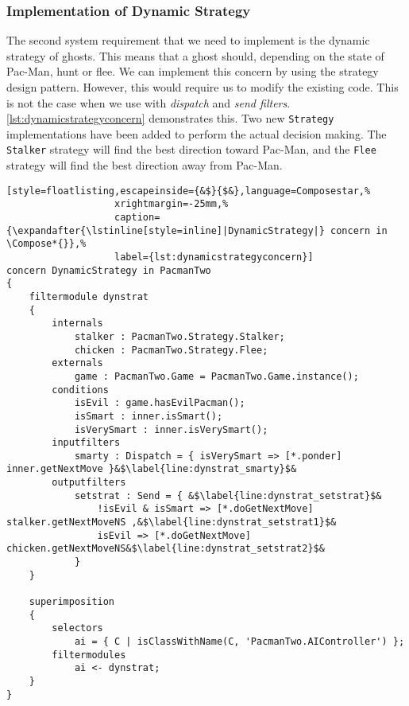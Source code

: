 \subsubsection{Implementation of Dynamic Strategy}

The second system requirement that we need to implement is the dynamic strategy of ghosts.
This means that a ghost should, depending on the state of Pac-Man, hunt or flee.
We can implement this concern by using the strategy design pattern.
However, this would require us to modify the existing code.
This is not the case when we use \Compose*{} with \emph{dispatch} and \emph{send filters}.
\autoref{lst:dynamicstrategyconcern} demonstrates this. 
Two new \lstinline|Strategy| implementations have been added to perform the actual decision making. The \lstinline|Stalker| strategy will find the best direction toward Pac-Man, and the \lstinline|Flee| strategy will find the best direction away from Pac-Man.

\begin{lstlisting}[style=floatlisting,escapeinside={&$}{$&},language=Composestar,%
                   xrightmargin=-25mm,%
                   caption={\expandafter{\lstinline[style=inline]|DynamicStrategy|} concern in \Compose*{}},%
                   label={lst:dynamicstrategyconcern}]
concern DynamicStrategy in PacmanTwo
{
	filtermodule dynstrat
	{
		internals
			stalker : PacmanTwo.Strategy.Stalker;
			chicken : PacmanTwo.Strategy.Flee;
		externals
			game : PacmanTwo.Game = PacmanTwo.Game.instance();
		conditions
			isEvil : game.hasEvilPacman();
			isSmart : inner.isSmart();
			isVerySmart : inner.isVerySmart();
		inputfilters
			smarty : Dispatch = { isVerySmart => [*.ponder] inner.getNextMove }&$\label{line:dynstrat_smarty}$&
		outputfilters
			setstrat : Send = { &$\label{line:dynstrat_setstrat}$&
				!isEvil & isSmart => [*.doGetNextMove] stalker.getNextMoveNS ,&$\label{line:dynstrat_setstrat1}$&
				isEvil => [*.doGetNextMove] chicken.getNextMoveNS&$\label{line:dynstrat_setstrat2}$&
			}
	}

	superimposition
	{
		selectors
			ai = { C | isClassWithName(C, 'PacmanTwo.AIController') };
		filtermodules
			ai <- dynstrat;
	}
}
\end{lstlisting}

